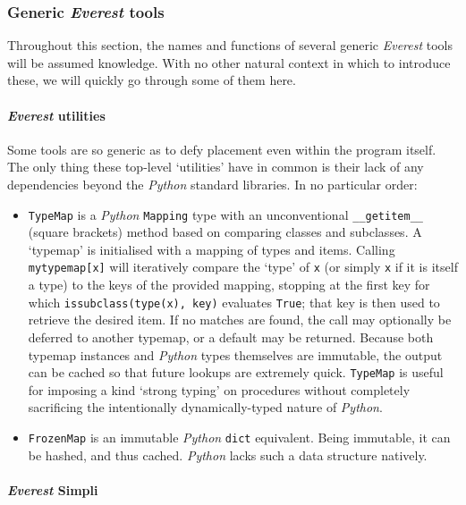 \documentclass[a4paper,11pt,oneside]{book}
\begin{document}
\subsubsection{Generic \textit{Everest} tools}

Throughout this section, the names and functions of several generic \textit{Everest} tools will be assumed knowledge. With no other natural context in which to introduce these, we will quickly go through some of them here.

\paragraph{\textit{Everest} utilities}

Some tools are so generic as to defy placement even within the program itself. The only thing these top-level `utilities' have in common is their lack of any dependencies beyond the \textit{Python} standard libraries. In no particular order:

\begin{itemize}
\item \texttt{TypeMap} is a \textit{Python} \texttt{Mapping} type with an unconventional \texttt{\_\_getitem\_\_} (square brackets) method based on comparing classes and subclasses. A `typemap' is initialised with a mapping of types and items. Calling \texttt{mytypemap[x]} will iteratively compare the `type' of \texttt{x} (or simply \texttt{x} if it is itself a type) to the keys of the provided mapping, stopping at the first key for which \texttt{issubclass(type(x), key)} evaluates \texttt{True}; that key is then used to retrieve the desired item. If no matches are found, the call may optionally be deferred to another typemap, or a default may be returned. Because both typemap instances and \textit{Python} types themselves are immutable, the output can be cached so that future lookups are extremely quick. \texttt{TypeMap} is useful for imposing a kind `strong typing' on procedures without completely sacrificing the intentionally dynamically-typed nature of \textit{Python}.
\item \texttt{FrozenMap} is an immutable \textit{Python} \texttt{dict} equivalent. Being immutable, it can be hashed, and thus cached. \textit{Python} lacks such a data structure natively.
\end{itemize}

\paragraph{\textit{Everest} Simpli}
\end{document}

